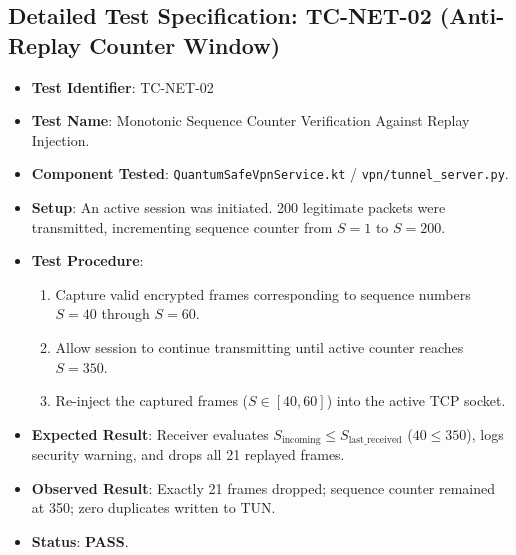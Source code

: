 \subsection{Detailed Test Specification: TC-NET-02 (Anti-Replay Counter Window)}
\begin{itemize}
    \item \textbf{Test Identifier}: TC-NET-02
    \item \textbf{Test Name}: Monotonic Sequence Counter Verification Against Replay Injection.
    \item \textbf{Component Tested}: \texttt{QuantumSafeVpnService.kt} / \texttt{vpn/tunnel\_server.py}.
    \item \textbf{Setup}: An active session was initiated. 200 legitimate packets were transmitted, incrementing sequence counter from $S = 1$ to $S = 200$.
    \item \textbf{Test Procedure}:
    \begin{enumerate}
        \item Capture valid encrypted frames corresponding to sequence numbers $S = 40$ through $S = 60$.
        \item Allow session to continue transmitting until active counter reaches $S = 350$.
        \item Re-inject the captured frames ($S \in [40, 60]$) into the active TCP socket.
    \end{enumerate}
    \item \textbf{Expected Result}: Receiver evaluates $S_{\text{incoming}} \le S_{\text{last\_received}}$ ($40 \le 350$), logs security warning, and drops all 21 replayed frames.
    \item \textbf{Observed Result}: Exactly 21 frames dropped; sequence counter remained at 350; zero duplicates written to TUN.
    \item \textbf{Status}: \textbf{PASS}.
\end{itemize}


